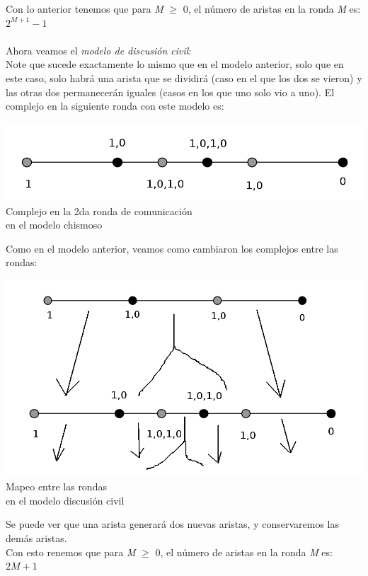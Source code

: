 \documentclass{article}
\begin{document}
\begin{enumerate}
{\begin{enumerate}
\begin{enumerate}
        Con lo anterior tenemos que para \textit{M} $≥$ 0, el número de aristas en la ronda
        \textit{M} es: $2^{M + 1}-1$\\\\
        Ahora veamos el \textit{modelo de discusión civil}:\\
        Note que sucede exactamente lo mismo que en el modelo anterior, solo que en este caso,
        solo habrá una arista que se dividirá (caso en el que los dos se vieron) y las otras dos
        permanecerán iguales (casos en los que uno solo vio a uno).
        El complejo en la siguiente ronda con este modelo es:
        \begin{center}
        \includegraphics[scale=0.95]{srondacivil1a.png}\\
        \scriptsize{Complejo en la 2da ronda de comunicación\\en el modelo chismoso}\\
        \end{center}
        Como en el modelo anterior, veamos como cambiaron los complejos entre las rondas:
        \begin{center}
        \includegraphics[scale=0.2]{cambiosrondascivil1a.png}\\
        \scriptsize{Mapeo entre las rondas\\en el modelo discusión civil}\\
        \end{center}
        Se puede ver que una arista generará dos nuevas aristas, y conservaremos
        las demás aristas.\\
        Con esto renemos que para \textit{M} $≥$ 0, el número de aristas en la ronda
        \textit{M} es: $2M + 1$\\


\end{enumerate}
\end{enumerate}}
\end{enumerate}
\end{document}
